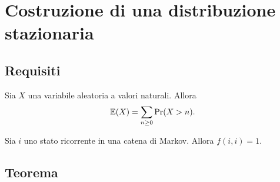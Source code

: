 \section{Costruzione di una distribuzione stazionaria}


\subsection{Requisiti}
\begin{prop}\label{prop:evrandvar}
	Sia $X$ una variabile aleatoria a valori naturali. Allora
	\begin{equation*}
		\mathbb E(X) = \sum_{n\ge0} \mathrm{Pr}(X>n) \text.
	\end{equation*}
\end{prop}

\begin{prop}\label{prop:ricorfii}
	Sia $i$ uno stato ricorrente in una catena di Markov. Allora $f(i,i)=1$.
\end{prop}


\subsection{Teorema}

